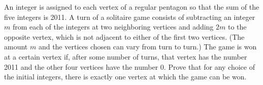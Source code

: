 An integer is assigned to each vertex of a regular pentagon so that the sum of the five integers is 2011.  A turn of a solitaire game consists of subtracting an integer $m$ from each of the integers at two neighboring vertices and adding $2m$ to the opposite vertex, which is not adjacent to either of the first two vertices.  (The amount $m$ and the vertices chosen can vary from turn to turn.)  The game is won at a certain vertex if, after some number of turns, that vertex has the number 2011 and the other four vertices have the number 0.  Prove that for any choice of the initial integers, there is exactly one vertex at which the game can be won.
